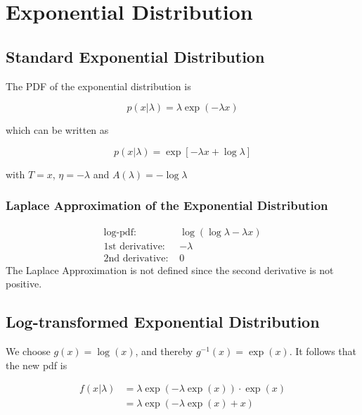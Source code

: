 \section{Exponential Distribution}

\subsection{Standard Exponential Distribution}

The PDF of the exponential distribution is

\begin{equation}
	p(x| \lambda) = \lambda \exp(-\lambda x)
	\label{eq:exponential_pdf}
\end{equation}

which can be written as

\begin{equation}
	p(x|\lambda) = \exp\left[-\lambda x + \log\lambda\right]
	\label{eq:exponential_exp_family}
\end{equation}

with $T=x$, $\eta = -\lambda$ and $A(\lambda) = -\log\lambda$

\subsubsection{Laplace Approximation of the Exponential Distribution}

\begin{align*}
\text{log-pdf: } &\log\left( \log \lambda - \lambda x\right) \\
\text{1st derivative: }& - \lambda \\
\text{2nd derivative: }& 0
\end{align*}
The Laplace Approximation is not defined since the second derivative is not positive. 

\subsection{Log-transformed Exponential Distribution}

We choose $g(x) = \log(x)$, and thereby $g^{-1}(x) = \exp(x)$. It follows that the new pdf is 

\begin{align}
	f(x|\lambda) &= \lambda \exp(-\lambda \exp(x)) \cdot \exp(x) \\ \nonumber
	&= \lambda \exp(-\lambda \exp(x) + x)
\end{align}

